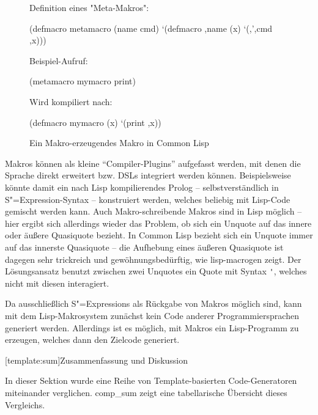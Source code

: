 \documentclass[12pt, a4paper, bibgerm]{scrbook}
\newenvironment{DIFnomarkup}{}{}
\newcommand\icode[1]{\lstinline?#1?}
\newcommand\lsection{}
\newcommand\abb{}
\newcommand{\sexp}{S"=Expression}
\newcommand{\sexps}{S"=Expressions}
\begin{document}
\begin{figure}[h]
  \centering
  \begin{DIFnomarkup}\begin{code}
Definition eines "Meta-Makros":

(defmacro metamacro (name cmd)
  `(defmacro ,name (x)
     `(,',cmd ,x)))    

Beispiel-Aufruf:

(metamacro mymacro print)

Wird kompiliert nach:

(defmacro mymacro (x)
  `(print ,x))
  \end{code}\end{DIFnomarkup}
  \caption{Ein Makro-erzeugendes Makro in Common Lisp}
  \label{magicl:fig:lisp-macrogen}
\end{figure}

Makros können als kleine "`Compiler-Plugins"' aufgefasst werden, mit
denen die Sprache direkt erweitert bzw. DSLs integriert werden
können. Beispielsweise könnte damit ein nach Lisp kompilierendes
Prolog \cite[S.388ff]{NorvigCL} -- selbstverständlich in \sexp{}-Syntax --
konstruiert werden, welches beliebig mit Lisp-Code gemischt werden
kann. Auch Makro-schreibende Makros sind in Lisp möglich -- hier ergibt
sich allerdings wieder das Problem, ob sich ein Unquote auf das innere
oder äußere Quasiquote bezieht. In Common Lisp bezieht sich ein Unquote
immer auf das innerste Quasiquote -- die Aufhebung eines äußeren
Quasiquote ist dagegen sehr trickreich und gewöhnungsbedürftig, wie
\abb{lisp-macrogen} zeigt. Der Lösungsansatz benutzt zwischen zwei
Unquotes ein Quote mit Syntax \icode{'}, welches nicht mit diesen
interagiert.

Da ausschließlich \sexps{} als Rückgabe von Makros möglich sind, kann
mit dem Lisp-Makrosystem zunächst kein Code anderer Programmiersprachen
generiert werden. Allerdings ist es möglich, mit Makros ein
Lisp-Programm zu erzeugen, welches dann den Zielcode generiert.

\lsection[template:sum]{Zusammenfassung und Diskussion}

In dieser Sektion wurde eine Reihe von Template-basierten
Code-Generatoren miteinander verglichen. \abb{comp_sum} zeigt eine
tabellarische Übersicht dieses Vergleichs. 
\end{document}
